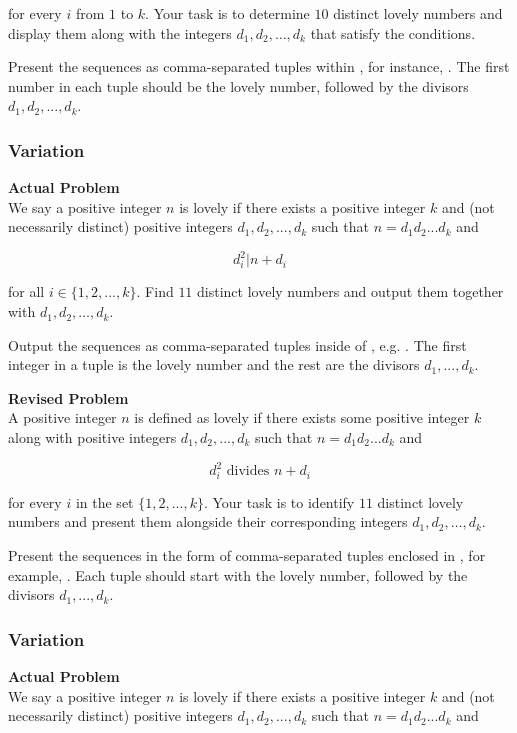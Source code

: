 for every $i$ from $1$ to $k$. Your task is to determine $10$ distinct lovely numbers and display them along with the integers $d_1, d_2, \ldots, d_k$ that satisfy the conditions.

Present the sequences as comma-separated tuples within \boxed, for instance, . The first number in each tuple should be the lovely number, followed by the divisors $d_1, d_2, ..., d_k$.

\subsubsection{Variation}
\textbf{Actual Problem}\\
We say a positive integer $n$ is lovely if there exists a positive integer $k$ and (not necessarily distinct) positive integers $d_1, d_2, ..., d_k$ such that $n = d_1 d_2 ... d_k$ and

$$d_i^2 | n + d_i$$

for all $i \in \{1, 2, ..., k\}$. Find $11$ distinct lovely numbers and output them together with $d_1, d_2, \ldots, d_k$.

Output the sequences as comma-separated tuples inside of \boxed, e.g. . The first integer in a tuple is the lovely number and the rest are the divisors $d_1, ..., d_k$.

\textbf{Revised Problem}\\
A positive integer $n$ is defined as lovely if there exists some positive integer $k$ along with positive integers $d_1, d_2, ..., d_k$ such that $n = d_1 d_2 ... d_k$ and

$$d_i^2 \text{ divides } n + d_i$$

for every $i$ in the set $\{1, 2, ..., k\}$. Your task is to identify $11$ distinct lovely numbers and present them alongside their corresponding integers $d_1, d_2, \ldots, d_k$.

Present the sequences in the form of comma-separated tuples enclosed in \boxed, for example, . Each tuple should start with the lovely number, followed by the divisors $d_1, ..., d_k$.

\subsubsection{Variation}
\textbf{Actual Problem}\\
We say a positive integer $n$ is lovely if there exists a positive integer $k$ and (not necessarily distinct) positive integers $d_1, d_2, ..., d_k$ such that $n = d_1 d_2 ... d_k$ and


